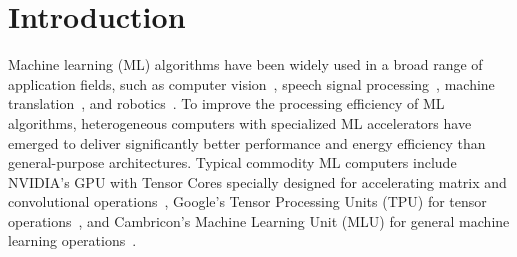 \begin{abstract}

\end{abstract}


\section{Introduction}

Machine learning (ML) algorithms have been widely used in a broad range of application fields, such as computer vision~\cite{liu2016ssd}, speech signal processing~\cite{amodei2016deep}, machine translation~\cite{bahdanau2014neural}, and robotics~\cite{redmon2015real}. To improve the processing efficiency of ML algorithms, heterogeneous computers with specialized ML accelerators have emerged to deliver significantly better performance and energy efficiency than general-purpose architectures. Typical commodity ML computers include NVIDIA's GPU with Tensor Cores specially designed for accelerating matrix and convolutional operations~\cite{markidis2018nvidia}, Google's Tensor Processing Units (TPU) for tensor operations~\cite{jouppi2017datacenter}, and Cambricon's Machine Learning Unit (MLU) for general machine learning operations~\cite{cambrion2016url}.


